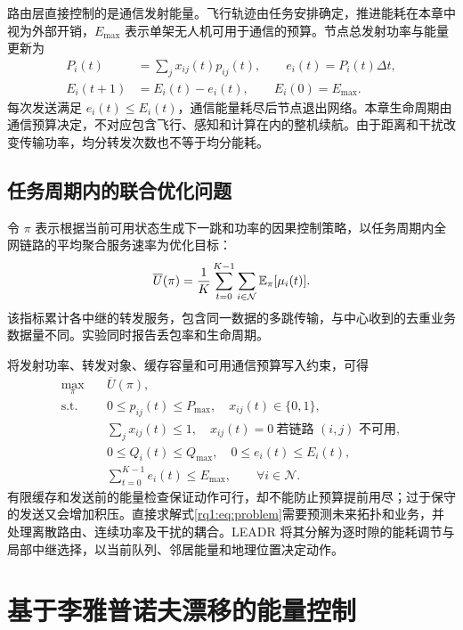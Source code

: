 路由层直接控制的是通信发射能量。飞行轨迹由任务安排确定，推进能耗在本章中视为外部开销，$E_{\max}$ 表示单架无人机可用于通信的预算。节点总发射功率与能量更新为
\begin{align}
 P_i(t)&=\sum_j x_{ij}(t)p_{ij}(t),\qquad e_i(t)=P_i(t)\Delta t,
 \label{rq1:eq:power_total}\\
 E_i(t+1)&=E_i(t)-e_i(t),\qquad E_i(0)=E_{\max}.
 \label{rq1:eq:energy_update}
\end{align}
每次发送满足 $e_i(t)\le E_i(t)$，通信能量耗尽后节点退出网络。本章生命周期由通信预算决定，不对应包含飞行、感知和计算在内的整机续航。由于距离和干扰改变传输功率，均分转发次数也不等于均分能耗。

\subsection{任务周期内的联合优化问题}

令 $\pi$ 表示根据当前可用状态生成下一跳和功率的因果控制策略，以任务周期内全网链路的平均聚合服务速率为优化目标：
\begin{equation}
 \overline{U}(\pi)=\frac{1}{K}\sum_{t=0}^{K-1}
                 \sum_{i\in\mathcal{N}}\mathbb{E}_{\pi}[\mu_i(t)].
 \label{rq1:eq:utility}
\end{equation}
该指标累计各中继的转发服务，包含同一数据的多跳传输，与中心收到的去重业务数据量不同。实验同时报告丢包率和生命周期。

将发射功率、转发对象、缓存容量和可用通信预算写入约束，可得
\begin{align}
 \max_{\pi}\quad &\overline{U}(\pi),\label{rq1:eq:problem}\\
 \text{s.t.}\quad
 &0\le p_{ij}(t)\le P_{\max},\quad x_{ij}(t)\in\{0,1\},\nonumber\\
 &\sum_jx_{ij}(t)\le1,\quad x_{ij}(t)=0\ \text{若链路 $(i,j)$ 不可用},\nonumber\\
 &0\le Q_i(t)\le Q_{\max},\quad 0\le e_i(t)\le E_i(t),\nonumber\\
 &\sum_{t=0}^{K-1}e_i(t)\le E_{\max},\qquad \forall i\in\mathcal{N}.\nonumber
\end{align}
有限缓存和发送前的能量检查保证动作可行，却不能防止预算提前用尽；过于保守的发送又会增加积压。直接求解式\eqref{rq1:eq:problem}需要预测未来拓扑和业务，并处理离散路由、连续功率及干扰的耦合。LEADR 将其分解为逐时隙的能耗调节与局部中继选择，以当前队列、邻居能量和地理位置决定动作。

\section{基于李雅普诺夫漂移的能量控制}
\label{rq1:sec:lyapunov}

